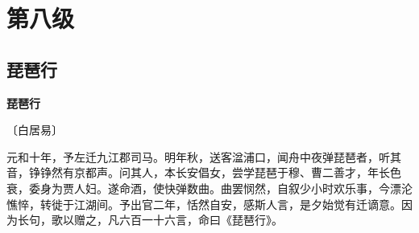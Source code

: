 \documentclass[12pt,UTF-8,openany,fontset=none]{ctexbook}
\begin{document}
\vspace{8pt}
\clearpage

\chapter{第八级}
\clearpage

\section{琵琶行}


\begin{center}
    {\bfseries 琵琶行}

    \vspace{18pt}

    \begin{large}\xuwen
        〔白居易〕
    \end{large}

\end{center}

    \vspace{12pt}\mbox{}

    \begin{large}\xuwen
        元和十年，予左迁九江郡司马。明年秋，送客湓浦口，闻舟中夜弹琵琶者，听其音，铮铮然有京都声。问其人，本长安倡女，尝学琵琶于穆、曹二善才，年长色衰，委身为贾人妇。遂命酒，使快弹数曲。曲罢悯然，自叙少小时欢乐事，今漂沦憔悴，转徙于江湖间。予出官二年，恬然自安，感斯人言，是夕始觉有迁谪意。因为长句，歌以赠之，凡六百一十六言，命曰《琵琶行》。
    \end{large}


    \vspace{12pt}
\end{document}
